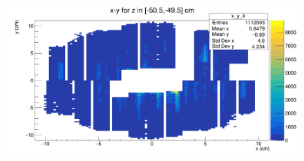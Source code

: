 \documentclass[11pt]{beamer}
\begin{document}
\begin{frame}
\begin{columns}[c]
\begin{column}{0.5\textwidth}
\begin{figure}
\begin{center}
                \end{center}
            \end{figure}
            \begin{figure}
                \begin{center}
                    \includegraphics[width=\textwidth]{Plots/MFT_pass3/x_y_4.png}
                \end{center}
            \end{figure}
        \end{column}
    \end{columns}

\end{frame}
\end{document}
